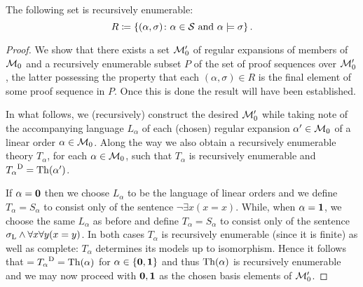 \begin{lem}
	The following set is recursively enumerable:
	\begin{equation}
		R\coloneqq\left\lbrace (\alpha,\sigma)\colon \alpha\in\mathcal{S}\text{ and }\alpha\models\sigma \right\rbrace.
	\end{equation}
\end{lem}
\begin{proof}
	We show that there exists  a set $\mathcal{M}_0^\prime$ of regular expansions of members of $\mathcal{M}_0$ and a recursively enumerable subset $P$ of the set of proof sequences over $\mathcal{M}_0^\prime$, the latter possessing the property that each $(\alpha,\sigma)\in R$ is the final element of some proof sequence in $P$.  Once this is done the result will have been established.

	In what follows, we (recursively) construct the desired $\mathcal{M}_0^\prime$ while taking note of the accompanying language $L_\alpha$ of each (chosen) regular expansion $\alpha^\prime\in\mathcal{M}_0$ of a linear order $\alpha\in\mathcal{M}_0$.  Along the way we also obtain a recursively enumerable theory $T_\alpha$, for each $\alpha\in\mathcal{M}_0$, such that $T_\alpha$ is recursively enumerable and ${T_\alpha}^\mathrm{D}=\operatorname{Th}(\alpha^\prime)$.

	If $\alpha=\mathbf{0}$ then we choose $L_\alpha$ to be the language of linear orders and we define $T_\alpha=S_\alpha$ to consist only of the sentence $\neg\exists x(x=x)$.  While, when $\alpha=\mathbf{1}$, we choose the same $L_\alpha$ as before and define $T_\alpha=S_\alpha$ to consist only of the sentence $\sigma_{\mathrm{L}}\wedge\forall x\forall y(x=y)$.  In both cases $T_\alpha$ is recursively enumerable (since it is finite) as well as complete:  $T_\alpha$ determines its models up to isomorphism.  Hence it follows that ${=T_\alpha}^\mathrm{D}=\operatorname{Th}(\alpha)$ for $\alpha\in\left\lbrace \mathbf{0},\mathbf{1}\right\rbrace$ and thus $\operatorname{Th}(\alpha)$ is recursively enumerable and we may now proceed with $\mathbf{0}, \mathbf{1}$ as the chosen basis elements of $\mathcal{M}_0^\prime$.


\end{proof}
